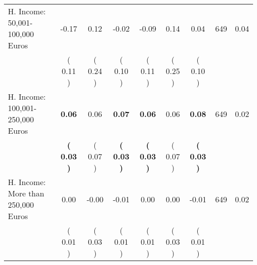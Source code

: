 \begin{tabular}{lcccccccc}
H. Income: 50,001-100,000 Euros &     -0.17 &      0.12 &     -0.02 &     -0.09 &      0.14 &      0.04 & 649 &       0.04 \\ 
 & (     0.11 ) & (     0.24 ) & (     0.10 ) & (     0.11 ) & (     0.25 ) & (     0.10 ) & \\
H. Income: 100,001-250,000 Euros & \textbf{     0.06} &      0.06 & \textbf{     0.07} & \textbf{     0.06} &      0.06 & \textbf{     0.08} & 649 &       0.02 \\ 
 & \textbf{(     0.03 )} & (     0.07 ) & \textbf{(     0.03 )} & \textbf{(     0.03 )} & (     0.07 ) & \textbf{(     0.03 )} & \\
H. Income: More than 250,000 Euros &      0.00 &     -0.00 &     -0.01 &      0.00 &      0.00 &     -0.01 & 649 &       0.02 \\ 
 & (     0.01 ) & (     0.03 ) & (     0.01 ) & (     0.01 ) & (     0.03 ) & (     0.01 ) & \\
\bottomrule
\end{tabular}
